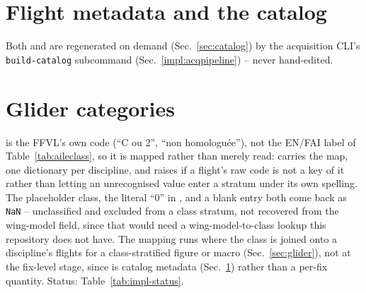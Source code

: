 \section{Flight metadata and the catalog}
\label{impl:catalog}
Both  and  are regenerated on demand
(Sec.~\ref{sec:catalog}) by the acquisition CLI's \texttt{build-catalog} subcommand
(Sec.~\ref{impl:acqpipeline}) -- never hand-edited.

\section{Glider categories}
\label{impl:glider}
 is the FFVL's own code (\enquote{C ou 2}, \enquote{non homologuée}),
not the EN/FAI label of Table~\ref{tab:aileclass}, so it is mapped rather than merely
read:  carries the map, one
dictionary per discipline, and raises if a flight's raw code is not a key of it rather
than letting an unrecognised value enter a stratum under its own spelling. The placeholder
class, the literal \enquote{0} in , and a blank entry both come back as
\texttt{NaN} -- unclassified and excluded from a class stratum, not recovered from the
wing-model field, since that would need a wing-model-to-class lookup this repository does
not have. The mapping runs where the class is joined onto a discipline's flights for a
class-stratified figure or macro (Sec.~\ref{sec:glider}), not at the fix-level stage,
since  is catalog metadata (Sec.~\ref{impl:catalog}) rather than a
per-fix quantity. Status: Table~\ref{tab:impl-status}.

